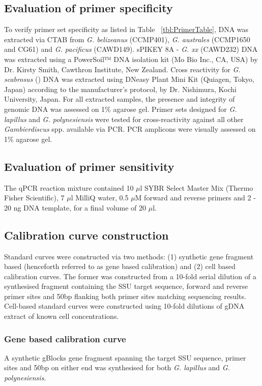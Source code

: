 \documentclass[12pt]{article}
\begin{document}
\subsection{Evaluation of primer specificity}
To verify primer set specificity as listed in Table ~\ref{tbl:PrimerTable}, DNA was extracted via CTAB from \emph{G. belizeanus} (CCMP401), \emph{G. australes} (CCMP1650 and CG61) and \emph{G. pacificus} (CAWD149). sPIKEY 8A - \emph{G. xx} (CAWD232) DNA was extracted using a PowerSoil™ DNA isolation kit (Mo Bio Inc., CA, USA) by Dr. Kirsty Smith, Cawthron Institute, New Zealand. Cross reactivity for \emph{G. scabrosus} () DNA was extracted using DNeasy Plant Mini Kit (Quiagen, Tokyo, Japan) according to the manufacturer's protocol, by Dr. Nishimura, Kochi University, Japan. For all extracted samples, the presence and integrity of genomic DNA was  assessed on 1\% agarose gel. Primer sets designed for \emph{G. lapillus} and \emph{G. polynesiensis} were tested for cross-reactivity against all other \emph{Gambierdiscus} spp. available via PCR. PCR amplicons were visually assessed on 1\% agarose gel.

\subsection{Evaluation of primer sensitivity}
 The qPCR reaction mixture contained 10 $\mu$l SYBR Select Master Mix (Thermo Fisher Scientific), 7 $\mu$l MilliQ water, 0.5 $\mu$M forward and reverse primers and 2 - 20 ng DNA template, for a final volume of 20 $\mu$l.

\subsection{Calibration curve construction}
Standard curves were constructed via two methods: (1) synthetic gene fragment based (henceforth referred to as gene based calibration) and (2) cell based calibration curves. The former was constructed from a 10-fold serial dilution of a synthesised fragment containing the SSU target sequence, forward and reverse primer sites and 50bp flanking both primer sites matching sequencing results. Cell-based standard curves were constructed using 10-fold dilutions of gDNA extract of known cell concentrations.
\subsubsection{Gene based calibration curve}
A synthetic gBlocks gene fragment spanning the target SSU sequence, primer sites and 50bp on either end was synthesised for both \emph{G. lapillus} and \emph{G. polynesiensis}.
\end{document}
